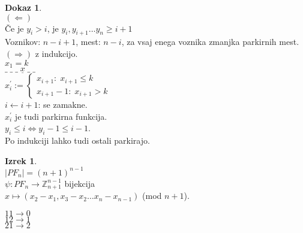 \documentclass[a4paper, 12pt]{book}
\theoremstyle{definition}
\newtheorem{theorem}[counter]{Izrek}
\newtheorem{pro}[counter]{Dokaz}
\theoremstyle{remark}
\newcommand{\Z}{\mathbb{Z}}
\begin{document}
\begin{pro} \text{} \\
  $(\Leftarrow)$ \\
  Če je $y_i > i$, je $y_i, y_{i+1} \dots y_n \geq i+1$ \\
  Voznikov: $n-i+1$, mest: $n-i$, za vsaj enega voznika zmanjka parkirnih mest. \\
  $(\Rightarrow)$ z indukcijo. \\
  $x_1 = k$ \\
  $\_ \; \_ \; \_ \; \underline{x} \; \_ \; \_$ \\
  $x_i^{'} := \begin{cases}
    x_{i+1}: \; x_{i+1} \leq k \\
    x_{i+1} - 1: \; x_{i+1} > k
  \end{cases}$ \\
  $i \leftarrow i+1$: se zamakne. \\
  $x_i^{'}$ je tudi parkirna funkcija. \\
  $y_i \leq i \iff y_{i}-1 \leq i-1$. \\
  Po indukciji lahko tudi ostali parkirajo.
\end{pro}
\begin{theorem} \text{} \\
  $|PF_n| = (n+1)^{n-1}$ \\
  $\psi: PF_n \to \Z_{n+1}^{n-1}$ bijekcija \\
  $x \mapsto (x_2 - x_1, x_3 - x_2 \dots x_n - x_{n-1})$ (mod $n+1$).
\end{theorem}
$1 1 \to 0$ \\
$1 2 \to 1$ \\
$2 1 \to 2$
\end{document}
